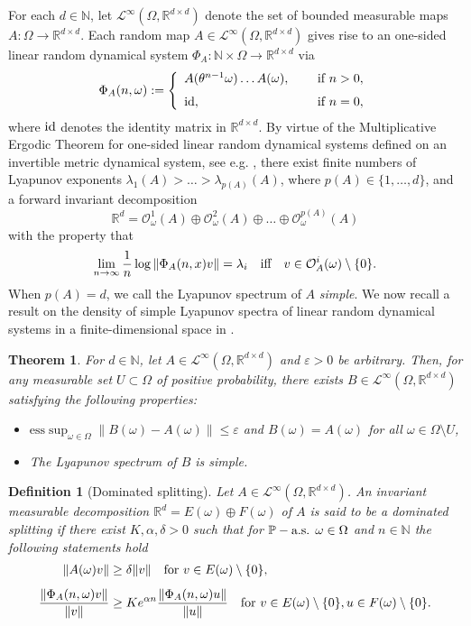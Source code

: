 \documentclass[pdflatex,sn-mathphys-num]{sn-jnl}%
\theoremstyle{thmstyleone}%
\newtheorem{theorem}{Theorem}%
\theoremstyle{thmstyletwo}%
\theoremstyle{thmstylethree}%
\newtheorem{definition}{Definition}%
\newcommand{\N}{\mathbb{N}}
\newcommand{\R}{\mathbb{R}}
\newcommand{\mP}{\mathbb{P}}
\newcommand{\cL}{\mathcal{L}}
\newcommand{\id}{\hbox{id}}
\newcommand{\eps}{\varepsilon}
\numberwithin{equation}{section}
\begin{document}
For each $d\in \N$, let $\mathcal L^{\infty}(\Omega,\R^{d\times d})$ denote the set of bounded measurable maps $A:\Omega\rightarrow \R^{d\times d}$. Each random  map $A\in \mathcal L^{\infty}(\Omega,\R^{d\times d})$  gives rise to an one-sided linear random dynamical system $\Phi_A:\N\times \Omega \rightarrow \R^{d\times d}$ via
\[
\Phi_A(n,\omega)
:=
\left\{
\begin{array}{ll}
A(\theta^{n-1}\omega)\dots A(\omega),
& \quad \hbox{ if }  n>0,\\[1.5ex]
\id, & \quad \hbox{ if }  n=0,
\end{array}
\right.
\]
where $\id$ denotes the identity matrix in $\R^{d\times d}$. By virtue of the Multiplicative Ergodic Theorem for one-sided linear random dynamical systems defined on an invertible metric dynamical system, see e.g. \cite{Froyland}, there exist finite numbers of Lyapunov exponents $\lambda_1(A)>\dots >\lambda_{p(A)}(A)$, where $p(A)\in \{1,\dots, d\}$, and a forward invariant decomposition
\[
\R^d=\mathcal O^1_{\omega}(A)\oplus \mathcal O^2_{\omega}(A)\oplus\dots\oplus \mathcal O^{p(A)}_{\omega}(A)
\]
with the property that
\[
\lim_{n\to \infty} \frac{1}{n}\log\|\Phi_A(n,x)v\|=\lambda_i\quad\hbox{iff}\quad v\in \mathcal O^i_A(\omega)\setminus\{0\}.
\]
%
%
%
When $p(A)=d$, we call the Lyapunov spectrum of $A$ \emph{simple}.  We now recall a result on the density of simple Lyapunov spectra of linear random dynamical systems in a finite-dimensional space in \cite{Arnold_Cong_1999}.
%
\begin{theorem}\label{Density}
 For $d\in\N$, let   $A\in \cL^{\infty}(\Omega,\R^{d\times d})$ and $\eps>0$ be arbitrary. Then, for any  measurable set $U\subset \Omega$ of positive probability, there exists $B\in \cL^{\infty}(\Omega,\R^{d\times d})$ satisfying the following properties:
\begin{itemize}
\item [(i)] $\mbox{ess}\sup_{\omega\in\Omega}\|B(\omega)-A(\omega)\|\leq \eps$ and $
B(\omega)=A(\omega)$ for all  $\omega\in\Omega\setminus U$,	
%
\item [(ii)] The Lyapunov spectrum of $B$ is simple. 	
\end{itemize}
\end{theorem}
%
\begin{definition}[Dominated splitting]\label{IntegralSeparation}
Let  $A\in \cL^{\infty}(\Omega,\R^{d\times d})$. An invariant measurable decomposition $\R^d=E(\omega)\oplus F(\omega)$ of $A$ is said to be a \emph{dominated splitting} if there exist $K,\alpha,\delta>0$ such that for $\mP- \hbox{a.s. } \omega\in\Omega$ and $n\in\N$ the following statements hold
\begin{align}
\|A(\omega)v\|
& \geq
\delta \|v\|\quad \hbox{for }  
  v\in E(\omega)\setminus\{0\},\label{EquivalenceForm_Eq1a}\\[1ex]
\frac{\|\Phi_A(n,\omega)v\|}{\|v\|}
& \geq
K e^{\alpha n}
 \frac{\|\Phi_A(n,\omega)u\|}{\|u\|}\quad \hbox{for }  
 v\in E(\omega)\setminus\{0\}, u\in F(\omega)\setminus\{0\}.\label{EquivalenceForm_Eq1b}
\end{align}
\end{definition}
\end{document}
